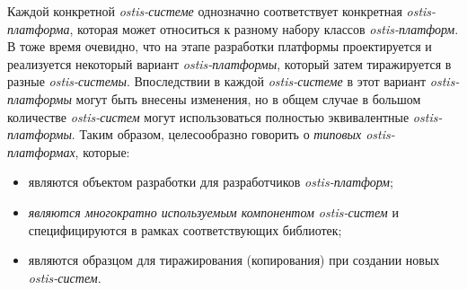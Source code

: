 Каждой конкретной \textit{ostis-системе} однозначно соответствует конкретная \textit{ostis-платформа}, которая может относиться к разному набору классов \textit{ostis-платформ}. В тоже время очевидно, что на этапе разработки платформы проектируется и реализуется некоторый вариант \textit{ostis-платформы}, который затем тиражируется в разные \textit{ostis-системы}. Впоследствии в каждой \textit{ostis-системе} в этот вариант \textit{ostis-платформы} могут быть внесены изменения, но в общем случае в большом количестве \textit{ostis-систем} могут использоваться полностью эквивалентные \textit{ostis-платформы}. Таким образом, целесообразно говорить о \textit{типовых ostis-платформах}, которые:
\begin{itemize}
	\item являются объектом разработки для разработчиков \textit{ostis-платформ};
	\item \textit{являются многократно используемым компонентом ostis-систем} и специфицируются в рамках соответствующих библиотек;
	\item являются образцом для тиражирования (копирования) при создании новых \textit{ostis-систем}.
\end{itemize}
		
%